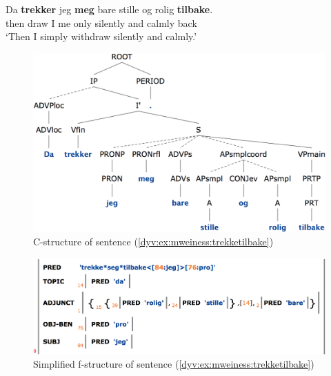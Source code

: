 \documentclass[output=paper]{langsci/langscibook}
\begin{document}
\ea\label{dyv:ex:mweiness:trekketilbake}
\gll Da \textbf{trekker} jeg \textbf{meg} bare stille og rolig \textbf{tilbake}.\\
     then draw I me only silently and calmly back\\
\glt `Then I simply withdraw silently and calmly.'
\z


\begin{figure}
  \includegraphics[height=.31\textheight]{figures/trekketilbake-c.png}
  \caption{C-structure of sentence (\ref{dyv:ex:mweiness:trekketilbake})}
  \label{dyv:fig:mweiness:trekketilbake-c}
\end{figure}

\begin{figure}
  \includegraphics[height=.175\textheight]{figures/trekketilbake-f.png}
  \caption{Simplified f-structure of sentence (\ref{dyv:ex:mweiness:trekketilbake})}
  \label{dyv:fig:mweiness:trekketilbake-f}
\end{figure}
\end{document}
